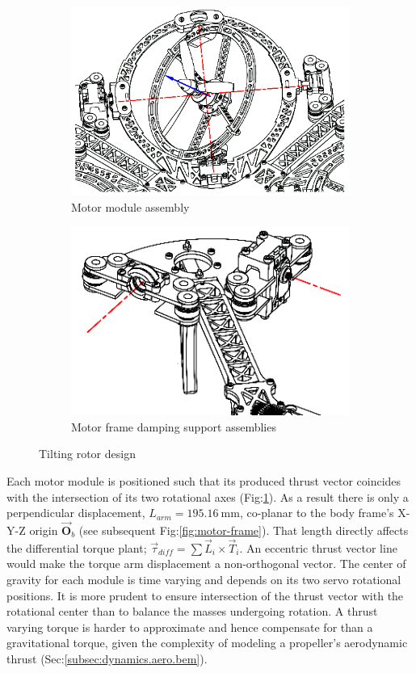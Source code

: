 \begin{figure}[hbtp]
\begin{subfigure}{.49\textwidth}
\centering
\includegraphics[width=\textwidth]{figs/motor-assembly}
\caption{Motor module assembly}
\label{fig:motor-assembly}
\end{subfigure}
\begin{subfigure}{.49\textwidth}
\centering
\includegraphics[width=\textwidth]{figs/motor-support}
\caption{Motor frame damping support assemblies}
\label{fig:motor_support}
\end{subfigure}
\caption{Tilting rotor design}
\end{figure}
Each motor module is positioned such that its produced thrust vector coincides with the intersection of its two rotational axes (Fig:\ref{fig:motor-assembly}). As a result there is only a perpendicular displacement, $L_{arm}=195.16~\text{mm}$, co-planar to the body frame's X-Y-Z origin $\vec{\mathbf{O}}_b$ (see subsequent Fig:\ref{fig:motor-frame}). That length directly affects the differential torque plant; $\vec{\tau}_{diff}=\sum\vec{L}_i\times\vec{T}_i$. An eccentric thrust vector line would make the torque arm displacement a non-orthogonal vector. The center of gravity for each module is time varying and depends on its two servo rotational positions. It is more prudent to ensure intersection of the thrust vector with the rotational center than to balance the masses undergoing rotation. A thrust varying torque is harder to approximate and hence compensate for than a gravitational torque, given the complexity of modeling a propeller's aerodynamic thrust (Sec:\ref{subsec:dynamics.aero.bem}).
